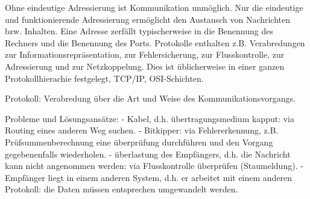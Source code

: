 \begin{answer}
Ohne eindeutige Adressierung ist Kommunikation unmöglich. Nur die eindeutige und funktionierende
Adressierung ermöglicht den Austausch von Nachrichten bzw. Inhalten.
Eine Adresse zerfällt typischerweise in die Benennung des Rechners und die Benennung des Ports.
Protokolle enthalten z.B. Verabredungen zur Informationsrepräsentation, zur Fehlersicherung, zur
Flusskontrolle, zur Adressierung und zur Netzkoppelung. Dies ist üblicherweise in einer ganzen
Protokollhierachie festgelegt, TCP/IP, OSI-Schichten.
\end{answer}

\begin{answer}
Protokoll: Verabredung über die Art und Weise des Kommunikationsvorgangs.
\end{answer}

\begin{answer}
Probleme und Lösungsansätze:
- Kabel, d.h. übertragungsmedium kapput: via Routing eines anderen Weg suchen.
- Bitkipper: via Fehlererkennung, z.B. Prüfsummenberechnung eine überprüfung durchführen und
den Vorgang gegebenenfalls wiederholen.
- überlastung des Empfängers, d.h. die Nachricht kann nicht angenommen werden: via Flusskontrolle
überprüfen (Staumeldung).
- Empfänger liegt in einem anderen System, d.h. er arbeitet mit einem anderen Protokoll: die
Daten müssen entsprechen umgewandelt werden.
\end{answer}

